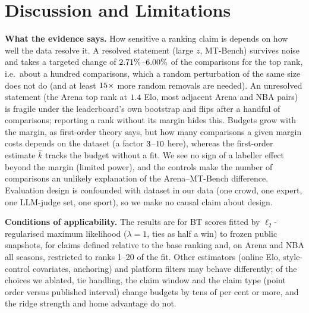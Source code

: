 \documentclass{article}
\begin{document}
\section{Discussion and Limitations}
\label{sec:limits}
\textbf{What the evidence says.} How sensitive a ranking claim is depends on how well the data resolve it. A resolved statement (large $z$, MT-Bench) survives noise and takes a targeted change of $2.71\%$--$6.00\%$ of the comparisons for the top rank, i.e.\ about a hundred comparisons, which a random perturbation of the same size does not do (and at least $15\times$ more random removals are needed). An unresolved statement (the Arena top rank at $1.4$ Elo, most adjacent Arena and NBA pairs) is fragile under the leaderboard's own bootstrap and flips after a handful of comparisons; reporting a rank without its margin hides this. Budgets grow with the margin, as first-order theory says, but how many comparisons a given margin costs depends on the dataset (a factor $3$--$10$ here), whereas the first-order estimate $\hat k$ tracks the budget without a fit. We see no sign of a labeller effect beyond the margin (limited power), and the controls make the number of comparisons an unlikely explanation of the Arena--MT-Bench difference. Evaluation design is confounded with dataset in our data (one crowd, one expert, one LLM-judge set, one sport), so we make no causal claim about design.

\textbf{Conditions of applicability.} The results are for BT scores fitted by $\ell_2$-regularised maximum likelihood ($\lambda=1$, ties as half a win) to frozen public snapshots, for claims defined relative to the base ranking and, on Arena and NBA all seasons, restricted to ranks 1--20 of the fit. Other estimators (online Elo, style-control covariates, anchoring) and platform filters may behave differently; of the choices we ablated, tie handling, the claim window and the claim type (point order versus published interval) change budgets by tens of per cent or more, and the ridge strength and home advantage do not.
\end{document}
